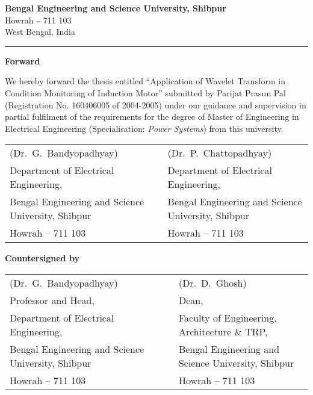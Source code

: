 \documentclass[a4paper,11pt]{report}
\begin{document}
\thispagestyle{empty}
\vspace*{7mm}
\begin{center}
{\Large \textbf{Bengal Engineering and Science University, Shibpur}}\\
\vspace{3.5pt}
{\large Howrah -- 711 103}\\
\vspace{3.5pt}
{\large West Bengal, India}
\end{center}
\hrule

\vspace{25mm}
\begin{center}
{\Large \textbf{Forward}}
\end{center}

\noindent We hereby forward the thesis entitled ``Application of Wavelet Transform in Condition Monitoring of Induction Motor'' submitted by Parijat Prasun Pal (Registration No. 160406005 of 2004-2005) under our guidance and supervision in partial fulfilment of the requirements for the degree of Master of Engineering in Electrical Engineering (Specialisation: \emph{Power Systems}) from this university.

\vspace{25mm}
\begin{flushleft}
\begin{tabular}{@{} lcl @{}}
(Dr.~G.~Bandyopadhyay) & & (Dr.~P.~Chattopadhyay)\\
{\footnotesize Department of Electrical Engineering,} & & {\footnotesize Department of Electrical Engineering,}\\
{\footnotesize Bengal Engineering and Science University, Shibpur} & & {\footnotesize Bengal Engineering and Science University, Shibpur}\\
{\footnotesize Howrah -- 711 103} & & {\footnotesize Howrah -- 711 103}
\end{tabular}

\vspace{20mm}
\noindent \textbf{Countersigned by}

\vspace{25mm}
\begin{tabular}{@{} lcl @{}}
(Dr.~G.~Bandyopadhyay)& & (Dr.~D.~Ghosh)\\
{\footnotesize Professor and Head,}& & {\footnotesize Dean,}\\
{\footnotesize Department of Electrical Engineering,}& &{\footnotesize Faculty of Engineering, Architecture \& TRP,}\\
{\footnotesize Bengal Engineering and Science University, Shibpur}& &{\footnotesize Bengal Engineering and Science University, Shibpur}\\
{\footnotesize Howrah -- 711 103}& &{\footnotesize Howrah -- 711 103}
\end{tabular}
\end{flushleft}
\clearpage
\end{document}
